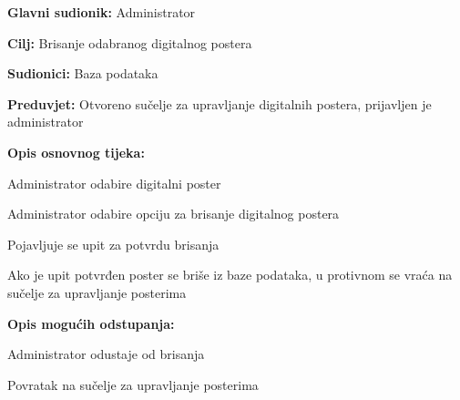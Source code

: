 					\noindent {}
					\begin{packed_item}
						
						\item \textbf{Glavni sudionik: } Administrator
						\item  \textbf{Cilj:} Brisanje odabranog digitalnog postera
						\item  \textbf{Sudionici:} Baza podataka
						\item  \textbf{Preduvjet:} Otvoreno sučelje za upravljanje digitalnih postera, prijavljen je administrator
						\item  \textbf{Opis osnovnog tijeka:}
						
						\item[] \begin{packed_enum}
							
							\item Administrator odabire digitalni poster
							\item Administrator odabire opciju za brisanje digitalnog postera
							\item Pojavljuje se upit za potvrdu brisanja
							\item Ako je upit potvrđen poster se briše iz baze podataka, u protivnom se vraća na sučelje za upravljanje posterima
						\end{packed_enum}
						
						\item  \textbf{Opis mogućih odstupanja:}
						
						\item[] \begin{packed_item}
							
							\item[4.a] Administrator odustaje od brisanja
							\item[] \begin{packed_enum}
								
								\item Povratak na sučelje za upravljanje posterima
							\end{packed_enum}
							
						\end{packed_item}
					\end{packed_item}
					
